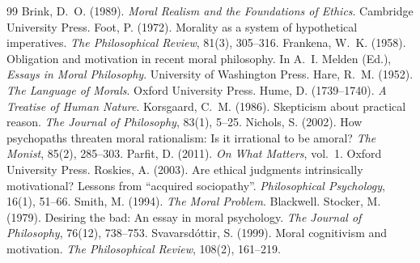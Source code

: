 \documentclass{situationist-preprint}
\begin{document}
\begin{thebibliography}{99}\small
{} Brink, D.~O. (1989). \emph{Moral Realism and the Foundations of Ethics}. Cambridge University Press.
 Foot, P. (1972). Morality as a system of hypothetical imperatives. \emph{The Philosophical Review}, 81(3), 305--316.
 Frankena, W.~K. (1958). Obligation and motivation in recent moral philosophy. In A.~I. Melden (Ed.), \emph{Essays in Moral Philosophy}. University of Washington Press.
 Hare, R.~M. (1952). \emph{The Language of Morals}. Oxford University Press.
 Hume, D. (1739--1740). \emph{A Treatise of Human Nature}.
 Korsgaard, C.~M. (1986). Skepticism about practical reason. \emph{The Journal of Philosophy}, 83(1), 5--25.
 Nichols, S. (2002). How psychopaths threaten moral rationalism: Is it irrational to be amoral? \emph{The Monist}, 85(2), 285--303.
 Parfit, D. (2011). \emph{On What Matters}, vol.~1. Oxford University Press.
 Roskies, A. (2003). Are ethical judgments intrinsically motivational? Lessons from \enquote{acquired sociopathy}. \emph{Philosophical Psychology}, 16(1), 51--66.
 Smith, M. (1994). \emph{The Moral Problem}. Blackwell.
 Stocker, M. (1979). Desiring the bad: An essay in moral psychology. \emph{The Journal of Philosophy}, 76(12), 738--753.
 Svavarsd{\'o}ttir, S. (1999). Moral cognitivism and motivation. \emph{The Philosophical Review}, 108(2), 161--219.
\end{thebibliography}
\end{document}
